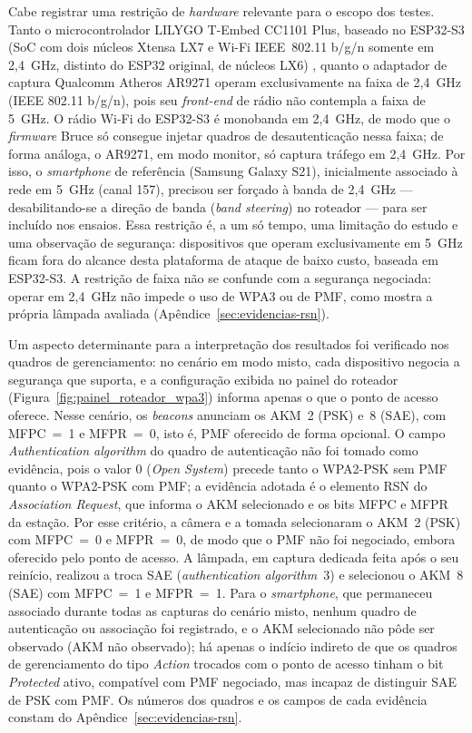 Cabe registrar uma restrição de \textit{hardware} relevante para o escopo dos testes. Tanto o microcontrolador LILYGO T-Embed CC1101 Plus, baseado no ESP32-S3 (SoC com dois núcleos Xtensa LX7 e Wi-Fi IEEE~802.11 b/g/n somente em 2,4~GHz, distinto do ESP32 original, de núcleos LX6) \cite{EspressifS3Datasheet}, quanto o adaptador de captura Qualcomm Atheros AR9271 operam exclusivamente na faixa de 2,4~GHz (IEEE 802.11 b/g/n), pois seu \textit{front-end} de rádio não contempla a faixa de 5~GHz. O rádio Wi-Fi do ESP32-S3 é monobanda em 2,4~GHz, de modo que o \textit{firmware} Bruce só consegue injetar quadros de desautenticação nessa faixa; de forma análoga, o AR9271, em modo monitor, só captura tráfego em 2,4~GHz. Por isso, o \textit{smartphone} de referência (Samsung Galaxy S21), inicialmente associado à rede em 5~GHz (canal 157), precisou ser forçado à banda de 2,4~GHz --- desabilitando-se a direção de banda (\textit{band steering}) no roteador --- para ser incluído nos ensaios. Essa restrição é, a um só tempo, uma limitação do estudo e uma observação de segurança: dispositivos que operam exclusivamente em 5~GHz ficam fora do alcance desta plataforma de ataque de baixo custo, baseada em ESP32-S3. A restrição de faixa não se confunde com a segurança negociada: operar em 2,4~GHz não impede o uso de WPA3 ou de PMF, como mostra a própria lâmpada avaliada (Apêndice~\ref{sec:evidencias-rsn}).

Um aspecto determinante para a interpretação dos resultados foi verificado nos quadros de gerenciamento: no cenário em modo misto, cada dispositivo negocia a segurança que suporta, e a configuração exibida no painel do roteador (Figura~\ref{fig:painel_roteador_wpa3}) informa apenas o que o ponto de acesso oferece. Nesse cenário, os \textit{beacons} anunciam os AKM~2 (PSK) e~8 (SAE), com MFPC~=~1 e MFPR~=~0, isto é, PMF oferecido de forma opcional. O campo \textit{Authentication algorithm} do quadro de autenticação não foi tomado como evidência, pois o valor 0 (\textit{Open System}) precede tanto o WPA2-PSK sem PMF quanto o WPA2-PSK com PMF; a evidência adotada é o elemento RSN do \textit{Association Request}, que informa o AKM selecionado e os bits MFPC e MFPR da estação. Por esse critério, a câmera e a tomada selecionaram o AKM~2 (PSK) com MFPC~=~0 e MFPR~=~0, de modo que o PMF não foi negociado, embora oferecido pelo ponto de acesso. A lâmpada, em captura dedicada feita após o seu reinício, realizou a troca SAE (\textit{authentication algorithm}~3) e selecionou o AKM~8 (SAE) com MFPC~=~1 e MFPR~=~1. Para o \textit{smartphone}, que permaneceu associado durante todas as capturas do cenário misto, nenhum quadro de autenticação ou associação foi registrado, e o AKM selecionado não pôde ser observado (AKM não observado); há apenas o indício indireto de que os quadros de gerenciamento do tipo \textit{Action} trocados com o ponto de acesso tinham o bit \textit{Protected} ativo, compatível com PMF negociado, mas incapaz de distinguir SAE de PSK com PMF. Os números dos quadros e os campos de cada evidência constam do Apêndice~\ref{sec:evidencias-rsn}.

